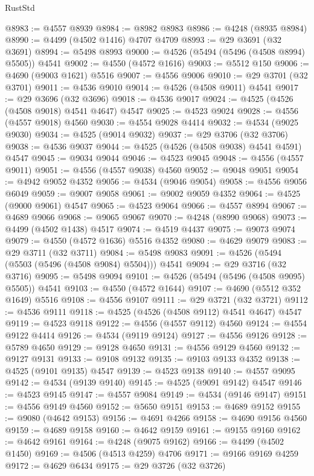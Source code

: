 \begin{lexlean}{RustStd}
\begin{coremodule}
@8983 := @4557 @8939
@8984 := @8982 @8983
@8986 := @4248 (@8935 @8984)
@8990 := @4499 (@4502 @1416) @4707 @4709
@8993 := @29 @3691 (@32 @3691)
@8994 := @5498 @8993
@9000 := @4526 (@5494 (@5496 (@4508 @8994) @5505)) @4541
@9002 := @4550 (@4572 @1616)
@9003 := @5512 @150
@9006 := @4690 (@9003 @1621) @5516
@9007 := @4556 @9006
@9010 := @29 @3701 (@32 @3701)
@9011 := @4536 @9010
@9014 := @4526 (@4508 @9011) @4541
@9017 := @29 @3696 (@32 @3696)
@9018 := @4536 @9017
@9024 := @4525 (@4526 (@4508 @9018) @4541 @4647) @4547
@9025 := @4523 @9024
@9028 := @4556 (@4557 @9018) @4560
@9030 := @4554 @9028 @4414
@9032 := @4534 (@9025 @9030)
@9034 := @4525 (@9014 @9032)
@9037 := @29 @3706 (@32 @3706)
@9038 := @4536 @9037
@9044 := @4525 (@4526 (@4508 @9038) @4541 @4591) @4547
@9045 := @9034 @9044
@9046 := @4523 @9045
@9048 := @4556 (@4557 @9011)
@9051 := @4556 (@4557 @9038) @4560
@9052 := @9048 @9051
@9054 := @4942 @9052 @4352
@9056 := @4534 (@9046 @9054)
@9058 := @4556 @9056 @6049
@9059 := @9007 @9058
@9061 := @9002 @9059 @4352
@9064 := @4525 (@9000 @9061) @4547
@9065 := @4523 @9064
@9066 := @4557 @8994
@9067 := @4689 @9066
@9068 := @9065 @9067
@9070 := @4248 (@8990 @9068)
@9073 := @4499 (@4502 @1438) @4517
@9074 := @4519 @4437
@9075 := @9073 @9074
@9079 := @4550 (@4572 @1636) @5516 @4352
@9080 := @4629 @9079
@9083 := @29 @3711 (@32 @3711)
@9084 := @5498 @9083
@9091 := @4526 (@5494 (@5503 (@5496 (@4508 @9084) @5504))) @4541
@9094 := @29 @3716 (@32 @3716)
@9095 := @5498 @9094
@9101 := @4526 (@5494 (@5496 (@4508 @9095) @5505)) @4541
@9103 := @4550 (@4572 @1644)
@9107 := @4690 (@5512 @352 @1649) @5516
@9108 := @4556 @9107
@9111 := @29 @3721 (@32 @3721)
@9112 := @4536 @9111
@9118 := @4525 (@4526 (@4508 @9112) @4541 @4647) @4547
@9119 := @4523 @9118
@9122 := @4556 (@4557 @9112) @4560
@9124 := @4554 @9122 @4414
@9126 := @4534 (@9119 @9124)
@9127 := @4556 @9126
@9128 := @5789 @4650
@9129 := @9128 @4650
@9131 := @4556 @9129 @4560
@9132 := @9127 @9131
@9133 := @9108 @9132
@9135 := @9103 @9133 @4352
@9138 := @4525 (@9101 @9135) @4547
@9139 := @4523 @9138
@9140 := @4557 @9095
@9142 := @4534 (@9139 @9140)
@9145 := @4525 (@9091 @9142) @4547
@9146 := @4523 @9145
@9147 := @4557 @9084
@9149 := @4534 (@9146 @9147)
@9151 := @4556 @9149 @4560
@9152 := @5650 @9151
@9153 := @4689 @9152
@9155 := @9080 (@4642 @9153)
@9156 := @4691 @4266
@9158 := @4690 @9156 @4560
@9159 := @4689 @9158
@9160 := @4642 @9159
@9161 := @9155 @9160
@9162 := @4642 @9161
@9164 := @4248 (@9075 @9162)
@9166 := @4499 (@4502 @1450)
@9169 := @4506 (@4513 @4259) @4706
@9171 := @9166 @9169 @4259
@9172 := @4629 @6434
@9175 := @29 @3726 (@32 @3726)

\end{coremodule}
\end{lexlean}
